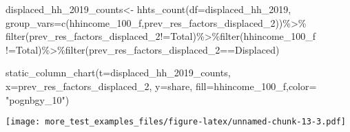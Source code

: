 \documentclass[
]{article}
\newenvironment{Shaded}{\begin{snugshade}}{\end{snugshade}}
\newcommand{\AttributeTok}[1]{\textcolor[rgb]{0.77,0.63,0.00}{#1}}
\newcommand{\FunctionTok}[1]{\textcolor[rgb]{0.00,0.00,0.00}{#1}}
\newcommand{\NormalTok}[1]{#1}
\newcommand{\OtherTok}[1]{\textcolor[rgb]{0.56,0.35,0.01}{#1}}
\newcommand{\SpecialCharTok}[1]{\textcolor[rgb]{0.00,0.00,0.00}{#1}}
\newcommand{\StringTok}[1]{\textcolor[rgb]{0.31,0.60,0.02}{#1}}
\begin{document}
\begin{Shaded}
\begin{Highlighting}[]
\NormalTok{displaced\_hh\_2019\_counts}\OtherTok{\textless{}{-}} \FunctionTok{hhts\_count}\NormalTok{(}\AttributeTok{df=}\NormalTok{displaced\_hh\_2019, }\AttributeTok{group\_vars=}\FunctionTok{c}\NormalTok{(}\StringTok{\textquotesingle{}hhincome\_100\_f\textquotesingle{}}\NormalTok{,}\StringTok{\textquotesingle{}prev\_res\_factors\_displaced\_2\textquotesingle{}}\NormalTok{))}\SpecialCharTok{\%\textgreater{}\%}
\FunctionTok{filter}\NormalTok{(prev\_res\_factors\_displaced\_2}\SpecialCharTok{!=}\StringTok{\textquotesingle{}Total\textquotesingle{}}\NormalTok{)}\SpecialCharTok{\%\textgreater{}\%}\FunctionTok{filter}\NormalTok{(hhincome\_100\_f }\SpecialCharTok{!=}\StringTok{\textquotesingle{}Total\textquotesingle{}}\NormalTok{)}\SpecialCharTok{\%\textgreater{}\%}\FunctionTok{filter}\NormalTok{(prev\_res\_factors\_displaced\_2}\SpecialCharTok{==}\StringTok{\textquotesingle{}Displaced\textquotesingle{}}\NormalTok{)}

\FunctionTok{static\_column\_chart}\NormalTok{(}\AttributeTok{t=}\NormalTok{displaced\_hh\_2019\_counts, }\AttributeTok{x=}\StringTok{\textquotesingle{}prev\_res\_factors\_displaced\_2\textquotesingle{}}\NormalTok{, }\AttributeTok{y=}\StringTok{\textquotesingle{}share\textquotesingle{}}\NormalTok{, }\AttributeTok{fill=}\StringTok{\textquotesingle{}hhincome\_100\_f\textquotesingle{}}\NormalTok{,}\AttributeTok{color=}  \StringTok{"pognbgy\_10"}\NormalTok{)}
\end{Highlighting}
\end{Shaded}

\texttt{[image: more\_test\_examples\_files/figure-latex/unnamed-chunk-13-3.pdf]}
\end{document}
